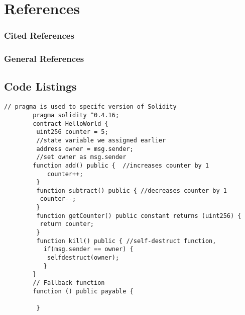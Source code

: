 \documentclass[12pt,tightenlines,letterpaper,listof=totoc]{scrartcl}
\begin{document}

\section{References}
\subsubsection*{Cited References}
\printbibliography[heading=none,category=cited]

\subsubsection*{General References}
\printbibliography[heading=none,notcategory=cited] 
\linespread{1}

\begin{appendices}
\section{Code Listings}
	\begin{lstlisting}[language=Solidity,caption=Smart contract in Solidity,label={lst:label}]
		// pragma is used to specifc version of Solidity
		pragma solidity ^0.4.16;
		contract HelloWorld {
		 uint256 counter = 5; 
		 //state variable we assigned earlier
		 address owner = msg.sender; 
		 //set owner as msg.sender
		function add() public {  //increases counter by 1
	  		counter++;
		 }
		 function subtract() public { //decreases counter by 1
		  counter--;
		 }
		 function getCounter() public constant returns (uint256) {
		  return counter;
		 } 
		 function kill() public { //self-destruct function, 
		   if(msg.sender == owner) {
		    selfdestruct(owner); 
		   }
		}
		// Fallback function
		function () public payable {
		
		 }
	\end{lstlisting}


\end{appendices}
\end{document}

